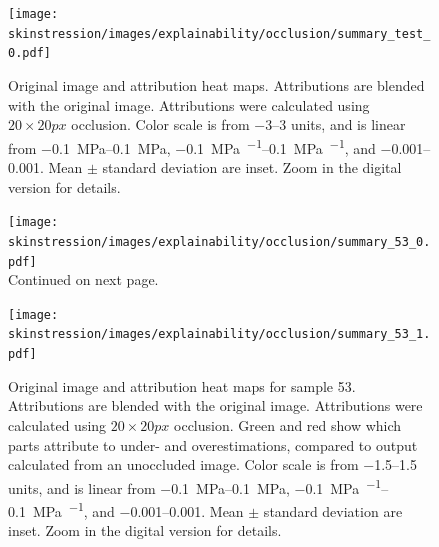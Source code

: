 \begin{figure}
    \centering
    \texttt{[image: skinstression/images/explainability/occlusion/summary\_test\_0.pdf]}
    \caption[Original image and attribution heat maps]{
        Original image and attribution heat maps.
        Attributions are blended with the original image.
        Attributions were calculated using $20\times 20\unit{px}$ occlusion.
        Color scale is from \numrange{-3}{3} units, and is linear from \qtyrange{-0.1}{0.1}{\mega\pascal}, \qtyrange{-0.1}{0.1}{\mega\pascal\per\stretch}, and \qtyrange{-0.001}{0.001}{\stretch}.
        Mean $\pm$ standard deviation are inset.
        Zoom in the digital version for details.
    }
    \label{fig:skin_occlusion}
\end{figure}


\begin{figure}
    \ContinuedFloat
    \centering
    \texttt{[image: skinstression/images/explainability/occlusion/summary\_53\_0.pdf]} \\
    \raggedleft Continued on next page.
\end{figure}
\begin{figure}
    \centering
    \texttt{[image: skinstression/images/explainability/occlusion/summary\_53\_1.pdf]}
    \caption[Original image and attribution heat maps for sample 53]{
        Original image and attribution heat maps for sample 53.
        Attributions are blended with the original image.
        Attributions were calculated using $20\times 20\unit{px}$ occlusion.
        Green and red show which parts attribute to under- and overestimations, compared to output calculated from an unoccluded image.
        Color scale is from \numrange{-1.5}{1.5} units, and is linear from \qtyrange{-0.1}{0.1}{\mega\pascal}, \qtyrange{-0.1}{0.1}{\mega\pascal\per\stretch}, and \qtyrange{-0.001}{0.001}{\stretch}.
        Mean $\pm$ standard deviation are inset.
        Zoom in the digital version for details.
    }
    \label{fig:skin_occlusion_53}
\end{figure}

